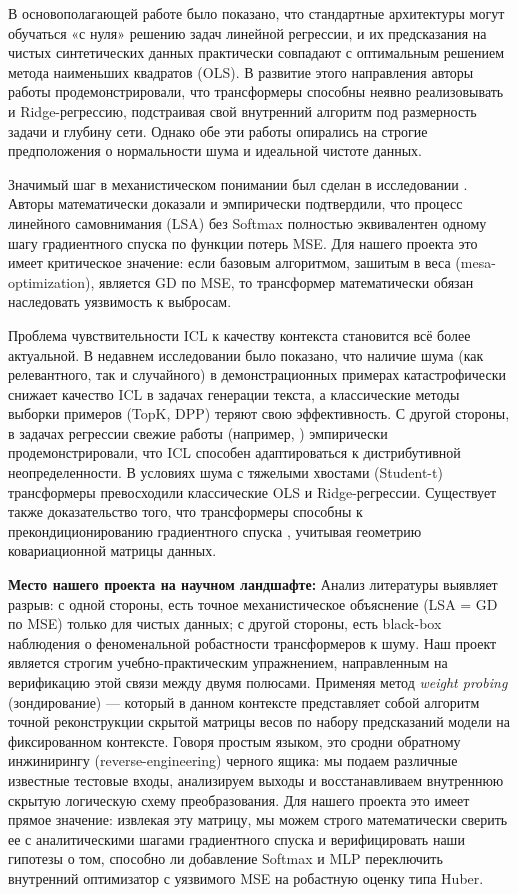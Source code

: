 \documentclass[12pt,a4paper]{article}
\begin{document}
В основополагающей работе \cite{garg2022what} было показано, что стандартные архитектуры могут обучаться «с нуля» решению задач линейной регрессии, и их предсказания на чистых синтетических данных практически совпадают с оптимальным решением метода наименьших квадратов (OLS). В развитие этого направления авторы работы \cite{akyurek2023what} продемонстрировали, что трансформеры способны неявно реализовывать и Ridge-регрессию, подстраивая свой внутренний алгоритм под размерность задачи и глубину сети. Однако обе эти работы опирались на строгие предположения о нормальности шума и идеальной чистоте данных.

Значимый шаг в механистическом понимании был сделан в исследовании \cite{vonOswald2023}. Авторы математически доказали и эмпирически подтвердили, что процесс линейного самовнимания (LSA) без Softmax полностью эквивалентен одному шагу градиентного спуска по функции потерь MSE. Для нашего проекта это имеет критическое значение: если базовым алгоритмом, зашитым в веса (mesa-optimization), является GD по MSE, то трансформер математически обязан наследовать уязвимость к выбросам.

Проблема чувствительности ICL к качеству контекста становится всё более актуальной. В недавнем исследовании \cite{gao2024noise} было показано, что наличие шума (как релевантного, так и случайного) в демонстрационных примерах катастрофически снижает качество ICL в задачах генерации текста, а классические методы выборки примеров (TopK, DPP) теряют свою эффективность. С другой стороны, в задачах регрессии свежие работы (например, \cite{cao2026robust}) эмпирически продемонстрировали, что ICL способен адаптироваться к дистрибутивной неопределенности. В условиях шума с тяжелыми хвостами (Student-t) трансформеры превосходили классические OLS и Ridge-регрессии. Существует также доказательство того, что трансформеры способны к прекондиционированию градиентного спуска \cite{ahn2023transformers}, учитывая геометрию ковариационной матрицы данных.

\textbf{Место нашего проекта на научном ландшафте:} Анализ литературы выявляет разрыв: с одной стороны, есть точное механистическое объяснение (LSA = GD по MSE) только для чистых данных; с другой стороны, есть black-box наблюдения о феноменальной робастности трансформеров к шуму. Наш проект является строгим учебно-практическим упражнением, направленным на верификацию этой связи между двумя полюсами. Применяя метод \textit{weight probing} (зондирование) — который в данном контексте представляет собой алгоритм точной реконструкции скрытой матрицы весов по набору предсказаний модели на фиксированном контексте. Говоря простым языком, это сродни обратному инжинирингу (reverse-engineering) черного ящика: мы подаем различные известные тестовые входы, анализируем выходы и восстанавливаем внутреннюю скрытую логическую схему преобразования. Для нашего проекта это имеет прямое значение: извлекая эту матрицу, мы можем строго математически сверить ее с аналитическими шагами градиентного спуска и верифицировать наши гипотезы о том, способно ли добавление Softmax и MLP переключить внутренний оптимизатор с уязвимого MSE на робастную оценку типа Huber.
\end{document}
